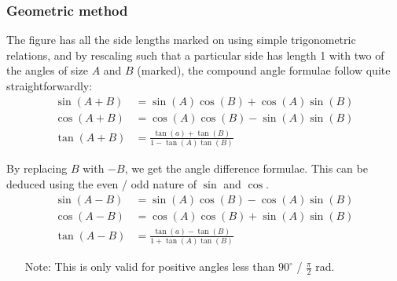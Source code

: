 \documentclass[11pt, a4paper]{article}
\begin{document}
\subsubsection*{Geometric method}
\begin{figure}[H]
\centering
{}
\end{figure}
The figure has all the side lengths marked on using simple trigonometric relations, and by rescaling such that a particular side has length 1 with two of the angles of size $A$ and $B$ (marked), the compound angle formulae follow quite straightforwardly:
\begin{align*}
\sin(A+B)&=\sin(A)\cos(B)+\cos(A)\sin(B) \\
\cos(A+B)&=\cos(A)\cos(B)-\sin(A)\sin(B) \\
\tan(A+B)&=\frac{\tan(a)+\tan(B)}{1-\tan(A)\tan(B)}
\end{align*}

By replacing $B$ with $-B$, we get the angle difference formulae. This can be deduced using the even / odd nature of $\sin$ and $\cos$.
\begin{align*}
\sin(A-B)&=\sin(A)\cos(B)-\cos(A)\sin(B) \\
\cos(A-B)&=\cos(A)\cos(B)+\sin(A)\sin(B) \\
\tan(A-B)&=\frac{\tan(a)-\tan(B)}{1+\tan(A)\tan(B)}
\end{align*}\par
\begin{itemize}
\item[Note:] This is only valid for positive angles less than $90^{\circ}$ / $\frac{\pi}{2}$ rad.
\end{itemize}
\end{document}
